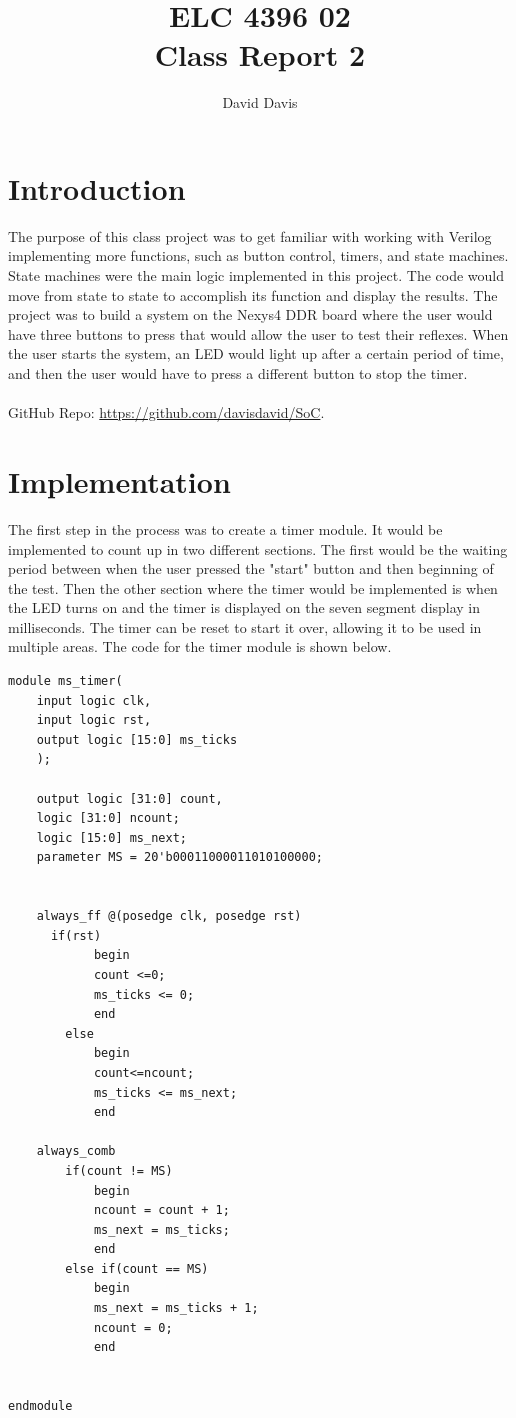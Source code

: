 \documentclass[11pt]{article}
\begin{document}
\title{ELC 4396 02 \\ Class Report 2}
\author{David Davis}

\maketitle


\section*{Introduction} 

The purpose of this class project was to get familiar with working with Verilog implementing more functions, such as button control, timers, and state machines. State machines were the main logic implemented in this project. The code would move from state to state to accomplish its function and display the results. The project was to build a system on the Nexys4 DDR board where the user would have three buttons to press that would allow the user to test their reflexes. When the user starts the system, an LED would light up after a certain period of time, and then the user would have to press a different button to stop the timer. \\\\GitHub Repo: \url{https://github.com/davisdavid/SoC}.


\section*{Implementation}

The first step in the process was to create a timer module. It would be implemented to count up in two different sections. The first would be the waiting period between when the user pressed the "start" button and then beginning of the test. Then the other section where the timer would be implemented is when the LED turns on and the timer is displayed on the seven segment display in milliseconds. The timer can be reset to start it over, allowing it to be used in multiple areas. The code for the timer module is shown below. 

\begin{lstlisting}[style=Verilog,caption=Timer Module ,label=code:ex ]
 module ms_timer(
    input logic clk,
    input logic rst,
    output logic [15:0] ms_ticks
    );
    
    output logic [31:0] count,
    logic [31:0] ncount;
    logic [15:0] ms_next;
    parameter MS = 20'b00011000011010100000;
    
    
    always_ff @(posedge clk, posedge rst)
      if(rst)
            begin
            count <=0; 
            ms_ticks <= 0;
            end
        else
            begin
            count<=ncount;
            ms_ticks <= ms_next;
            end
        
    always_comb
        if(count != MS)
            begin
            ncount = count + 1;
            ms_next = ms_ticks;
            end
        else if(count == MS)
            begin
            ms_next = ms_ticks + 1;
            ncount = 0;
            end
    
    
endmodule
\end{lstlisting}
\end{document}
